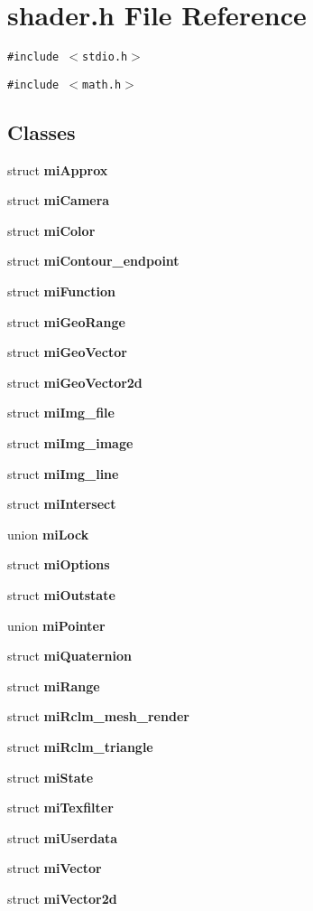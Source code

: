 \section{shader.h File Reference}
\label{shader_8h}
{\tt \#include $<$stdio.h$>$}\par
{\tt \#include $<$math.h$>$}\par
\subsection*{Classes}
\begin{CompactItemize}
\item 
struct {\bf mi\-Approx}
\item 
struct {\bf mi\-Camera}
\item 
struct {\bf mi\-Color}
\item 
struct {\bf mi\-Contour\_\-endpoint}
\item 
struct {\bf mi\-Function}
\item 
struct {\bf mi\-Geo\-Range}
\item 
struct {\bf mi\-Geo\-Vector}
\item 
struct {\bf mi\-Geo\-Vector2d}
\item 
struct {\bf mi\-Img\_\-file}
\item 
struct {\bf mi\-Img\_\-image}
\item 
struct {\bf mi\-Img\_\-line}
\item 
struct {\bf mi\-Intersect}
\item 
union {\bf mi\-Lock}
\item 
struct {\bf mi\-Options}
\item 
struct {\bf mi\-Outstate}
\item 
union {\bf mi\-Pointer}
\item 
struct {\bf mi\-Quaternion}
\item 
struct {\bf mi\-Range}
\item 
struct {\bf mi\-Rclm\_\-mesh\_\-render}
\item 
struct {\bf mi\-Rclm\_\-triangle}
\item 
struct {\bf mi\-State}
\item 
struct {\bf mi\-Texfilter}
\item 
struct {\bf mi\-Userdata}
\item 
struct {\bf mi\-Vector}
\item 
struct {\bf mi\-Vector2d}
\end{CompactItemize}
